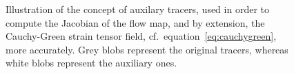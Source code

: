 \begin{figure}[htpb]
    \centering
    \def\svgwidth{0.8\linewidth}{}
    \caption[Illustration of the concept of auxiliary tracers]
    {Illustration of the concept of auxilary tracers, used in order to
    compute the Jacobian of the flow map, and by extension, the Cauchy-Green
    strain tensor field, cf.\ equation~\eqref{eq:cauchygreen}, more accurately.
    Grey blobs represent the original tracers, whereas white blobs represent
    the auxiliary ones.}
    \label{fig:auxiliarygrid}
\end{figure}
